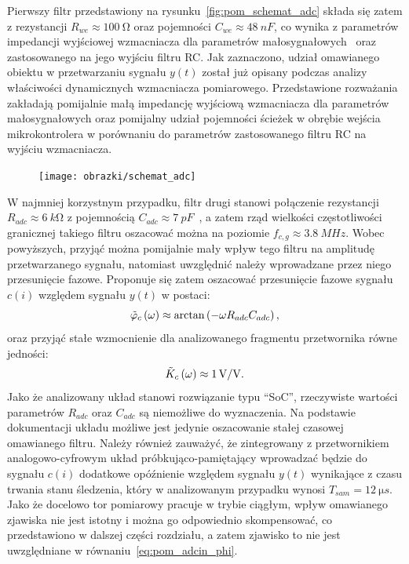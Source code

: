 Pierwszy filtr przedstawiony na rysunku~\ref{fig:pom_schemat_adc} składa się zatem z rezystancji $R_{we} \approx \qty{100}{\ohm}$ oraz pojemności $C_{we} \approx \qty{48}{nF}$, co wynika z parametrów impedancji wyjściowej wzmacniacza dla parametrów małosygnałowych~\cite{microchip_application} oraz zastosowanego na jego wyjściu filtru RC. Jak zaznaczono, udział omawianego obiektu w przetwarzaniu sygnału $y(t)$ został już opisany podczas analizy właściwości dynamicznych wzmacniacza pomiarowego. Przedstawione rozważania zakładają pomijalnie małą impedancję wyjściową wzmacniacza dla parametrów małosygnałowych oraz pomijalny udział pojemności ścieżek w obrębie wejścia mikrokontrolera w porównaniu do parametrów zastosowanego filtru RC na wyjściu wzmacniacza.

\begin{figure}[htb!]
\begin{center}
\texttt{[image: obrazki/schemat\_adc]}
\end{center}
\end{figure}

W najmniej korzystnym przypadku, filtr drugi stanowi połączenie rezystancji $R_{adc} \approx \qty{6}{k \ohm}$ z pojemnością $C_{adc} \approx \qty{7}{pF}$~\cite{stm_f411}, a zatem rząd wielkości częstotliwości granicznej takiego filtru oszacować można na poziomie $f_{c,g} \approx \qty{3.8}{MHz}$. Wobec powyższych, przyjąć można pomijalnie mały wpływ tego filtru na amplitudę przetwarzanego sygnału, natomiast uwzględnić należy wprowadzane przez niego przesunięcie fazowe. Proponuje się zatem oszacować przesunięcie fazowe sygnału $c(i)$ względem sygnału $y(t)$ w postaci:
\begin{equation}
\tilde{\varphi}_{c} \left(\omega\right) \approx \arctan \left(-\omega R_{adc} C_{adc}\right) \label{eq:pom_adcin_phi},
\end{equation}
oraz przyjąć stałe wzmocnienie dla analizowanego fragmentu przetwornika równe jedności:
\begin{equation}
\tilde{K}_{c} \left(\omega\right) \approx \qty{1}{V \per V} \label{eq:pom_adcin_amp}.
\end{equation}
Jako że analizowany układ stanowi rozwiązanie typu \enquote{SoC}, rzeczywiste wartości parametrów $R_{adc}$ oraz $C_{adc}$ są niemożliwe do wyznaczenia. Na podstawie dokumentacji układu możliwe jest jedynie oszacowanie stałej czasowej omawianego filtru. Należy również zauważyć, że zintegrowany z przetwornikiem analogowo-cyfrowym układ próbkująco-pamiętający wprowadzać będzie do sygnału $c(i)$ dodatkowe opóźnienie względem sygnału $y(t)$ wynikające z czasu trwania stanu śledzenia, który w analizowanym przypadku wynosi $T_{sam} = \qty{12}{\micro s}$. Jako że docelowo tor pomiarowy pracuje w trybie ciągłym, wpływ omawianego zjawiska nie jest istotny i można go odpowiednio skompensować, co przedstawiono w dalszej części rozdziału, a zatem zjawisko to nie jest uwzględniane w równaniu~\eqref{eq:pom_adcin_phi}.

